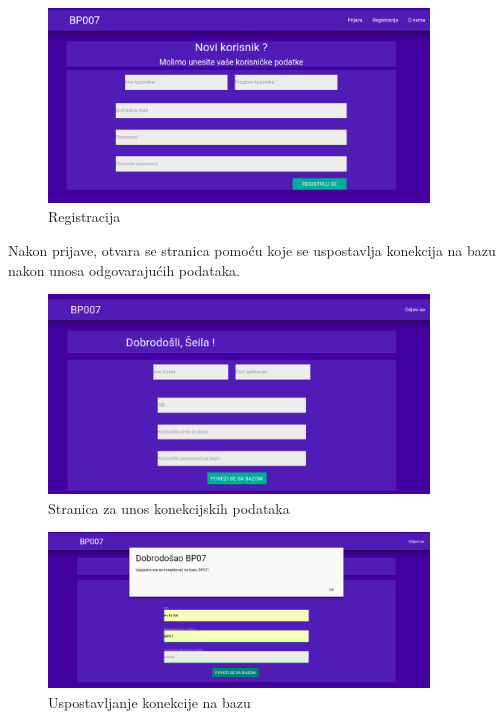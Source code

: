 \documentclass[12pt, a4paper]{report}
\theoremstyle{definition}
\begin{document}
\begin{figure}[H]
	\begin{center} 
		\includegraphics[width=0.9\textwidth]{a2.png}
	\end{center}
	\caption{Registracija}
\end{figure}

Nakon prijave, otvara se stranica pomoću koje se uspostavlja konekcija na bazu nakon unosa odgovarajućih podataka.

\begin{figure}[H]
	\begin{center} 
		\includegraphics[width=0.9\textwidth]{a3.png}
	\end{center}
	\caption{Stranica za unos konekcijskih podataka}
\end{figure}

\begin{figure}[H]
	\begin{center} 
		\includegraphics[width=0.9\textwidth]{a4.png}
	\end{center}
	\caption{Uspostavljanje konekcije na bazu}
\end{figure}
\end{document}

